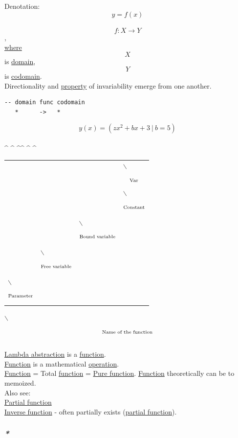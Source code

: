 \documentclass[11pt]{article}
\begin{document}
Denotation:\\
$$ y = f(x) $$\\
$$ f: X \to Y $$,\\
\hyperref[org3e5903d]{where} $$ X $$ is \hyperref[org494b48a]{domain}, $$ Y $$ is \hyperref[org410079d]{codomain}.\\

Directionality and \hyperref[orgf8c3cc7]{property} of invariability emerge from one another.\\
\begin{verbatim}
-- domain func codomain
   *      ->   *
\end{verbatim}

$$ y(x) = (zx^{2} + bx + 3 \ | \ b = 5) $$\\
\^{} \^{}    \^{}\^{}    \^{}   \^{}\\
\begin{center}
\begin{tabular}{llll}
 &  &  & $\backslash$$$ \textsubscript{Var} $$$\backslash$$$ \textsubscript{Constant} $$\\
 &  & $\backslash$$$ \textsubscript{Bound variable} $$\\
 & $\backslash$$$ \textsubscript{Free variable} $$\\
$\backslash$$$ \textsubscript{Parameter} $$\\
\end{tabular}
\end{center}
$\backslash$$$ \textsubscript{Name of the function} $$\\

\hyperref[org0d193f3]{Lambda abstraction} is a \hyperref[orge15bc14]{function}.\\
\hyperref[orge15bc14]{Function} is a mathematical \hyperref[org1173fe8]{operation}.\\

\hyperref[orge15bc14]{Function} = Total \hyperref[orge15bc14]{function} = \hyperref[orgf4f5f7d]{Pure function}. \hyperref[orge15bc14]{Function} theoretically can be to memoized.\\

Also see:\\
\hyperref[orge9a6e2e]{Partial function}\\
\hyperref[org27bfad4]{Inverse function} - often partially exists (\hyperref[orge9a6e2e]{partial function}).\\

\subsubsection{\emph{*}}
\label{sec:orgbff2a4a}
\end{document}
